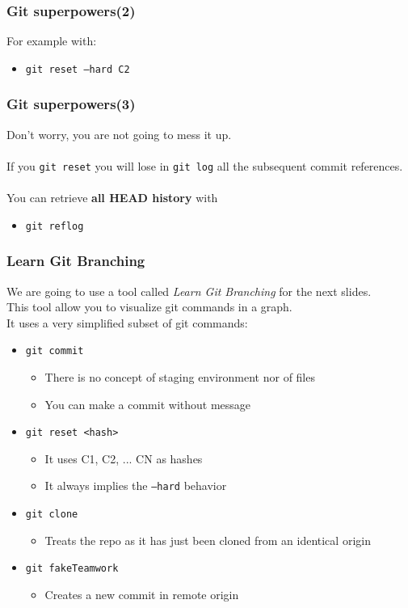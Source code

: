 \documentclass{beamer}
\begin{document}
\begin{frame}
    \frametitle{Git superpowers(2)}
    For example with:
    \begin{itemize}
        \item \texttt{git reset --hard C2}
    \end{itemize}
    
\end{frame}

\begin{frame}
    \frametitle{Git superpowers(3)}
    Don't worry, you are not going to mess it up. \\
    \hfill \\
    If you \texttt{git reset} you will lose in \texttt{git log} all the subsequent commit references. \\
    \hfill \\
    You can retrieve \textbf{all HEAD history} with   
    \begin{itemize}
        \item \texttt{git reflog}
    \end{itemize}
\end{frame}

\begin{frame}
    \frametitle{Learn Git Branching}
    We are going to use a tool called \textit{Learn Git Branching} for the next slides.\\
    This tool allow you to visualize git commands in a graph.\\
    It uses a very simplified subset of git commands:
    \begin{itemize}
        \item \texttt{git commit}
        \begin{itemize}
            \item There is no concept of staging environment nor of files
            \item You can make a commit without message
        \end{itemize}
        \item \texttt{git reset <hash>}
        \begin{itemize}
            \item It uses C1, C2, ... CN as hashes
            \item It always implies the \texttt{--hard} behavior 
        \end{itemize}
        \item \texttt{git clone}
        \begin{itemize}
            \item Treats the repo as it has just been cloned from an identical origin
        \end{itemize}
        \item \texttt{git fakeTeamwork}
        \begin{itemize}
            \item Creates a new commit in remote origin
        \end{itemize}
    \end{itemize}
\end{frame}
\end{document}
